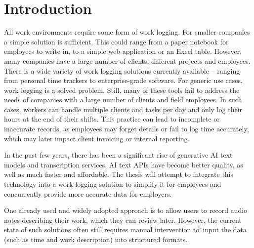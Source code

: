 \documentclass[
  digital,     %
  oneside,     %
  nosansbold,  %
  nocolorbold, %
  lof,         %
  lot,         %
]{fithesis4}
\begin{document}
\chapter*{Introduction}
All work environments require some form of work logging. For smaller companies a simple solution is sufficient. This could range from a paper notebook for employees to write in, to a simple web application or an Excel table. However, many companies have a large number of clients, different projects and employees. There is a wide variety of work logging solutions currently available – ranging from personal time trackers to enterprise-grade software. For generic use cases, work logging is a solved problem. Still, many of these tools fail to address the needs of companies with a large number of clients and field employees. In such cases, workers can handle multiple clients and tasks per day and only log their hours at the end of their shifts. This practice can lead to incomplete or inaccurate records, as employees may forget details or fail to log time accurately, which may later impact client invoicing or internal reporting.

In the past few years, there has been a significant rise of generative AI text models and transcription services. AI text APIs have become better quality, as well as  much faster and affordable. The thesis will attempt to integrate this technology into a work logging solution to simplify it for employees and concurrently provide more accurate data for employers.

One already used and widely adopted approach is to allow users to record audio notes describing their work, which they can review later. However, the current state of such solutions often still requires manual intervention to¨input the data (such as time and work description) into structured formats.
\end{document}
